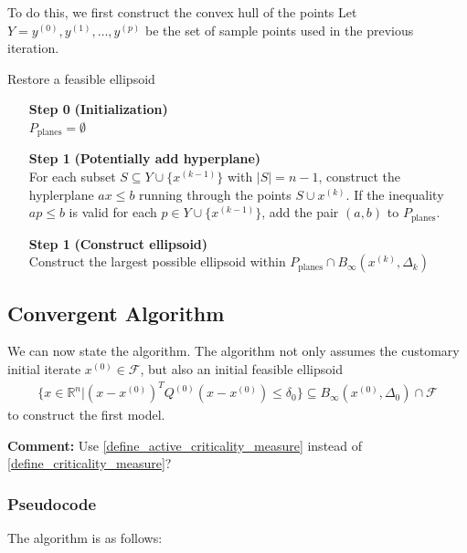 \documentclass{article}
\newenvironment{comment}
  {\par\medskip
   \color{red}%
   \begin{framed}
   \textbf{Comment: }\ignorespaces}
 {\end{framed}
  \medskip}
\theoremstyle{case}
\numberwithin{theorem}{subsection}
\newcommand{\dk}{\Delta_k}
\newcommand{\feasible}{{\mathcal F}}
\newcommand{\Rn}{\mathbb R^n}
\newcommand{\tr}{{ B_{\infty}\left(\xk, \dk\right) }}
\newcommand{\xk}{{x^{(k)}}}
\begin{document}
To do this, we first construct the convex hull of the points 
Let $Y = y^{(0)}, y^{(1)}, \ldots, y^{(p)}$ be the set of sample points used in the previous iteration.

\begin{algorithm}[H]
    \caption{Restore a feasible ellipsoid}
    \label{restore_feasible_ellipsoid}
    \begin{itemize}
        \item[\textbf{Step 0}] \textbf{(Initialization)} \\
            $P_{\textrm{planes}} = \emptyset$
            
        \item[\textbf{Step 1}] \textbf{(Potentially add hyperplane)} \\
	    For each subset $S \subseteq Y \cup \{x^{(k-1)}\}$ with $|S| = n - 1$, construct the hyplerplane $ax\le b$ running through the points $S \cup \xk$.
	    If the inequality $ap \le b$ is valid for each $p \in Y \cup \{x^{(k-1)}\}$, add the pair $(a, b)$ to $P_{\textrm{planes}}$.
	
	\item[\textbf{Step 1}] \textbf{(Construct ellipsoid)} \\
	   Construct the largest possible ellipsoid within $P_{\textrm{planes}} \cap \tr$
    \end{itemize}
\end{algorithm}


\subsection{Convergent Algorithm}

We can now state the algorithm.
The algorithm not only assumes the customary initial iterate $x^{(0)} \in \feasible$,
but also an initial feasible ellipsoid
\begin{align}
\{x \in\Rn | (x - x^{(0)})^T Q^{(0)} (x - x^{(0)}) \le \delta_0 \} \subseteq B_{\infty}\left(x^{(0)}, \Delta_{0}\right) \cap \feasible \label{initial_ellipsoid}
\end{align}
to construct the first model.



\begin{comment}
Use \cref{define_active_criticality_measure} instead of \cref{define_criticality_measure}?
\end{comment}


\subsubsection{Pseudocode}
The algorithm is as follows:
\end{document}
